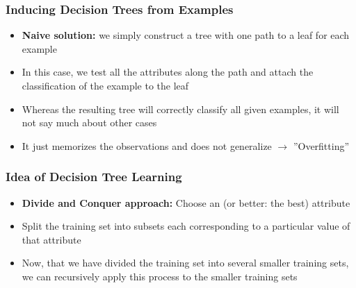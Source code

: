 \documentclass[conference, a4paper]{styles/acmsiggraph}
\begin{document}
\newpage

        \subsubsection{Inducing Decision Trees from Examples}
            \begin{itemize}
                \item \textbf{Naive solution:} we simply construct a tree with one path to a leaf for each example
                \item In this case, we test all the attributes along the path and attach the classification of the example to the leaf
                \item Whereas the resulting tree will correctly classify all given examples, it will not say much about other cases
                \item It just memorizes the observations and does not generalize\newline
                $\rightarrow$ ''Overfitting''
            \end{itemize}
        
        \subsubsection{Idea of Decision Tree Learning}
            \begin{itemize}
                \item \textbf{Divide and Conquer approach:} Choose an (or better: the best) attribute
                \item Split the training set into subsets each corresponding to a particular value of that attribute
                \item Now, that we have divided the training set into several smaller training sets, we can recursively apply this process to the smaller training sets
            \end{itemize}
        
\end{document}
